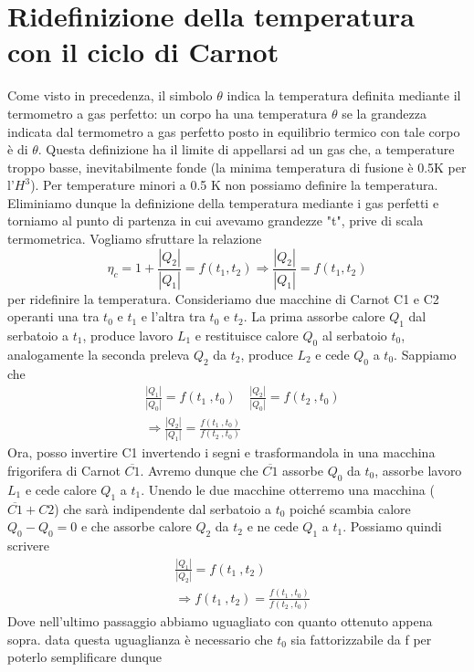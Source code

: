 \documentclass[10pt,a4paper]{article}
\begin{document}
\section{Ridefinizione della temperatura con il ciclo di Carnot}
Come visto in precedenza, il simbolo $\theta$ indica la temperatura definita mediante il termometro a gas perfetto: un corpo ha una temperatura $\theta$ se la grandezza indicata dal termometro a gas perfetto posto in equilibrio termico con tale corpo è di $\theta$. Questa definizione ha il limite di appellarsi ad un gas che, a temperature troppo basse, inevitabilmente fonde (la minima temperatura di fusione è 0.5K per l'$H^3$). Per temperature minori a 0.5 K non possiamo definire la temperatura.\\
Eliminiamo dunque la definizione della temperatura mediante i gas perfetti e torniamo al punto di partenza in cui avevamo grandezze "t", prive di scala termometrica. Vogliamo sfruttare la relazione \[\eta_c = 1+\frac{|Q_2|}{|Q_1|}=f(t_1,t_2) \Rightarrow \frac{|Q_2|}{|Q_1|}=f(t_1,t_2)\]
per ridefinire la temperatura. Consideriamo due macchine di Carnot C1 e C2 operanti una tra $t_0$ e $t_1$ e l'altra tra $t_0$ e $t_2$. La prima assorbe calore \(Q_1\) dal serbatoio a \(t_1\), produce lavoro \( L_1\) e restituisce calore \(Q_0\) al serbatoio \(t_0\), analogamente la seconda preleva \(Q_2\) da \(t_2\), produce \(L_2\) e cede \(Q_0\) a \(t_0\). Sappiamo che
\begin{align*}
	&\frac{|Q_1|}{|Q_0|} =f(t_1\ , t_0) \quad \frac{|Q_2|}{|Q_0|} =f(t_2\ , t_0)\\
	&\Rightarrow \frac{|Q_2|}{|Q_1|} =\frac{f(t_1\ , t_0)}{f(t_2\ , t_0)}
\end{align*}
Ora, posso invertire C1 invertendo i segni e trasformandola in una macchina frigorifera di Carnot $\overline{C1}$. Avremo dunque che $\overline{C1}$ assorbe \(Q_0\) da \(t_0\), assorbe lavoro \(L_1\) e cede calore \(Q_1\) a \(t_1\). Unendo le due macchine otterremo una macchina ($\overline{C1}+C2$) che sarà indipendente dal serbatoio a \(t_0\) poiché scambia calore \(Q_0-Q_0 =  0\) e che assorbe calore \(Q_2\) da \(t_2\) e ne cede \(Q_1\) a \(t_1\). Possiamo quindi scrivere
\begin{align*}
&\frac{|Q_1|}{|Q_2|} = f(t_1\ ,t_2)\\
&\Rightarrow f(t_1\ , t_2) = \frac{f(t_1\ ,t_0)}{f(t_2\ ,t_0)}
\end{align*}
Dove nell'ultimo passaggio abbiamo uguagliato con quanto ottenuto appena sopra. data questa uguaglianza è necessario che \(t_0\) sia fattorizzabile da f per poterlo semplificare dunque
\end{document}
